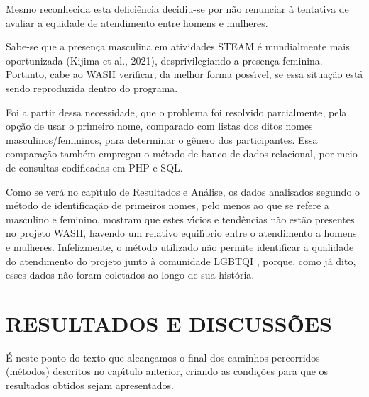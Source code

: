 \documentclass[
12pt,		%
openright,	%
twoside,  %
a4paper,			%
chapter=TITLE,		%
english,			%
french,				%
spanish,			%
brazil				%
]{USPSC-classe/USPSC}
\begin{document}
Mesmo reconhecida esta defici\^encia decidiu-se por n\~ao renunciar \`a tentativa de avaliar a equidade de atendimento entre homens e mulheres.














Sabe-se que a presen\c{c}a masculina em atividades STEAM \'e mundialmente mais oportunizada  (Kijima et al., 2021),  desprivilegiando a presen\c{c}a feminina. Portanto, cabe ao WASH verificar, da melhor forma poss\'{\i}vel, se essa situa\c{c}\~ao est\'a sendo reproduzida dentro do programa.














Foi a partir dessa necessidade, que o problema foi resolvido parcialmente, pela op\c{c}\~ao de usar o primeiro nome, comparado com listas dos ditos nomes masculinos/femininos, para determinar o g\^enero dos participantes. Essa compara\c{c}\~ao tamb\'em empregou o m\'etodo de banco de dados relacional, por meio de consultas codificadas em PHP e SQL.














Como se ver\'a no cap\'{\i}tulo de Resultados e An\'alise, os dados analisados segundo o m\'etodo de identifica\c{c}\~ao de primeiros nomes, pelo menos ao que se refere a masculino e feminino, mostram que estes v\'{\i}cios e tend\^encias n\~ao est\~ao presentes no projeto WASH, havendo um relativo equil\'{\i}brio entre o atendimento a homens e mulheres. Infelizmente, o m\'etodo utilizado n\~ao permite identificar a qualidade do atendimento do projeto junto \`a comunidade LGBTQI , porque, como j\'a dito, esses dados n\~ao foram coletados ao longo de sua hist\'oria.














\chapter[RESULTADOS E DISCUSS\~OES]{RESULTADOS E DISCUSS\~OES}\label{RESULTADOS E DISCUSS\~OES}
\'E neste ponto do texto que alcan\c{c}amos o final dos caminhos percorridos (m\'etodos) descritos no cap\'{\i}tulo anterior, criando as condi\c{c}\~oes para que os resultados obtidos sejam apresentados.
\end{document}
